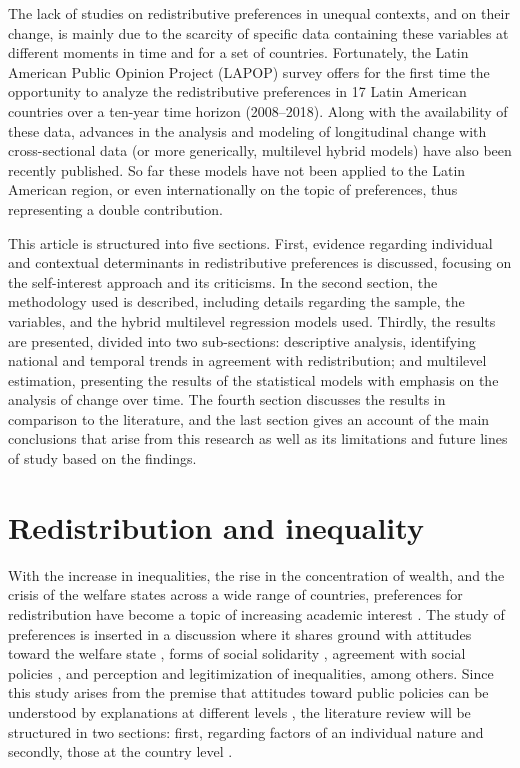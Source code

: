 \documentclass[utf8]{frontiersSCNS} %
\begin{document}
The lack of studies on redistributive preferences in unequal contexts, and on their change, is mainly due to the scarcity of specific data containing these variables at different moments in time and for a set of countries. Fortunately, the Latin American Public Opinion Project (LAPOP) survey offers for the first time the opportunity to analyze the redistributive preferences in 17 Latin American countries over a ten-year time horizon (2008–2018). Along with the availability of these data, advances in the analysis and modeling of longitudinal change with cross-sectional data \parencite{Schmidt-Catranrandomeffectsmultilevel2016} (or more generically, multilevel hybrid models) have also been recently published. So far these models have not been applied to the Latin American region, or even internationally on the topic of preferences, thus representing a double contribution.

This article is structured into five sections. First, evidence regarding individual and contextual determinants in redistributive preferences is discussed, focusing on the self-interest approach and its criticisms. In the second section, the methodology used is described, including details regarding the sample, the variables, and the hybrid multilevel regression models used. Thirdly, the results are presented, divided into two sub-sections: descriptive analysis, identifying national and temporal trends in agreement with redistribution; and multilevel estimation, presenting the results of the statistical models with emphasis on the analysis of change over time. The fourth section discusses the results in comparison to the literature, and the last section gives an account of the main conclusions that arise from this research as well as its limitations and future lines of study based on the findings.

\section{Redistribution and inequality}

With the increase in inequalities, the rise in the concentration of wealth, and the crisis of the welfare states across a wide range of countries, preferences for redistribution have become a topic of increasing academic interest \parencite{rueda_stegmueller_2019}. The study of preferences is inserted in a discussion where it shares ground with attitudes toward the welfare state \parencite{Eger2017, Roosma2014, Reeskens2012}, forms of social solidarity \parencite{Janmaat2009}, agreement with social policies \parencite{Kwon2016}, and perception and legitimization of inequalities, among others. Since this study arises from the premise that attitudes toward public policies can be understood by explanations at different levels \parencite{AlesinaPreferencesRedistribution2009}, the literature review will be structured in two sections: first, regarding factors of an individual nature \parencite{AlesinaPreferencesRedistribution2009, FrankoInequalitySelfInterestPublic2013, McCallUndeservingRichAmerican2013} and secondly, those at the country level \parencite{EdlundTrustgovernmentwelfare1999, IsakssonPreferencesredistributioncountry2009, KenworthyInequalitypublicopinion2007}.
\end{document}
